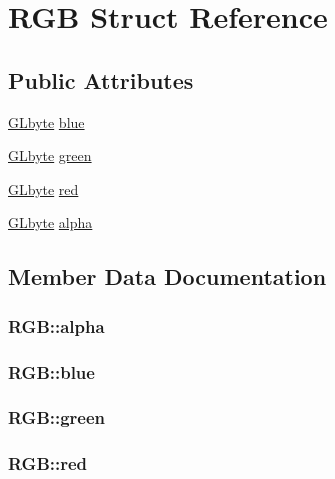 \hypertarget{struct_r_g_b}{\section{R\-G\-B Struct Reference}
\label{struct_r_g_b}
}
\subsection*{Public Attributes}
\begin{DoxyCompactItemize}
\item 
\hyperlink{_g_l_e_w_2glew_8h_a0a9e8b1f1d9c4bcf1c0bc5d5d4e3608a}{G\-Lbyte} \hyperlink{struct_r_g_b_aa440cf7af84000884badb6524623bc4a}{blue}
\item 
\hyperlink{_g_l_e_w_2glew_8h_a0a9e8b1f1d9c4bcf1c0bc5d5d4e3608a}{G\-Lbyte} \hyperlink{struct_r_g_b_ae9e710ee803682d0555d6b220819e995}{green}
\item 
\hyperlink{_g_l_e_w_2glew_8h_a0a9e8b1f1d9c4bcf1c0bc5d5d4e3608a}{G\-Lbyte} \hyperlink{struct_r_g_b_ae44a96f25dfbd5f3d4405a052d37d0ff}{red}
\item 
\hyperlink{_g_l_e_w_2glew_8h_a0a9e8b1f1d9c4bcf1c0bc5d5d4e3608a}{G\-Lbyte} \hyperlink{struct_r_g_b_a8beba6ce85ad54127c2257aa7603e211}{alpha}
\end{DoxyCompactItemize}


\subsection{Member Data Documentation}
\hypertarget{struct_r_g_b_a8beba6ce85ad54127c2257aa7603e211}{
\subsubsection[{alpha}]{ R\-G\-B\-::alpha}}\label{struct_r_g_b_a8beba6ce85ad54127c2257aa7603e211}
\hypertarget{struct_r_g_b_aa440cf7af84000884badb6524623bc4a}{
\subsubsection[{blue}]{ R\-G\-B\-::blue}}\label{struct_r_g_b_aa440cf7af84000884badb6524623bc4a}
\hypertarget{struct_r_g_b_ae9e710ee803682d0555d6b220819e995}{
\subsubsection[{green}]{ R\-G\-B\-::green}}\label{struct_r_g_b_ae9e710ee803682d0555d6b220819e995}
\hypertarget{struct_r_g_b_ae44a96f25dfbd5f3d4405a052d37d0ff}{
\subsubsection[{red}]{ R\-G\-B\-::red}}\label{struct_r_g_b_ae44a96f25dfbd5f3d4405a052d37d0ff}


